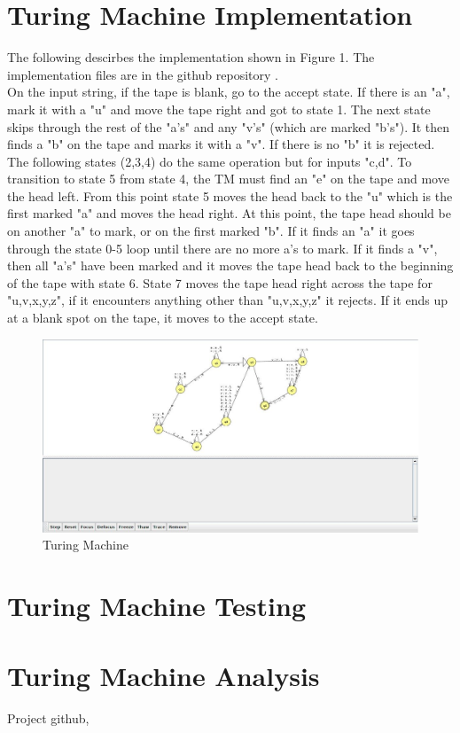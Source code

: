 \documentclass{article}
\begin{document}
\section{Turing Machine Implementation}
The following descirbes the implementation shown in Figure 1. The implementation files are in the github repository \cite{git}.\\
On the input string, if the tape is blank, go to the accept state. If there is an "a", mark it with a "u" and move the tape right and got to state 1. The next state skips through the rest of the "a's" and any "v's" (which are marked "b's"). It then finds a "b" on the tape and marks it with a "v". If there is no "b" it is rejected. The following states (2,3,4) do the same operation but for inputs "c,d". To transition to state 5 from state 4, the TM must find an "e" on the tape and move the head left. From this point state 5 moves the head back to the "u" which is the first marked "a" and moves the head right. At this point, the tape head should be on another "a" to mark, or on the first marked "b". If it finds an "a" it goes through the state 0-5 loop until there are no more a's to mark. If it finds a "v", then all "a's" have been marked and it moves the tape head back to the beginning of the tape with state 6. State 7 moves the tape head right across the tape for "u,v,x,y,z", if it encounters anything other than "u,v,x,y,z" it rejects. If it ends up at a blank spot on the tape, it moves to the accept state.
\begin{figure}[h!]
  \includegraphics[width=\linewidth]{TuringMachine.jpg}
  \caption{Turing Machine}
  \label{fig:TM1}
\end{figure}

\section{Turing Machine Testing}

\section{Turing Machine Analysis}

\begin{thebibliography}{9}
Project github,
\\

\end{thebibliography}
\end{document}
